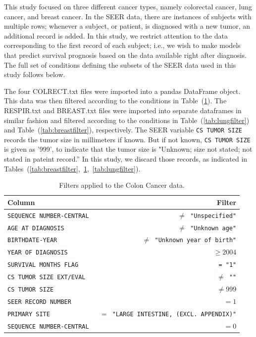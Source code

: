 \documentclass[10pt,letterpaper]{article}
\newcommand{\codewhite}[1]{\colorbox{white}{\texttt{#1}}}
\begin{document}
This study focused on three different cancer types, namely colorectal cancer, lung cancer, and breast cancer. 
In the SEER data, there are instances of subjects with multiple rows; whenever a subject, or patient, is diagnosed with a new tumor, an additional record is added. In this study, we restrict attention to the data corresponding to the first record of each subject; i.e., we wish to make models that predict survival prognosis based on the data available right after diagnosis. The full set of conditions defining the subsets of the SEER data used in this study follows below.



 The four COLRECT.txt files were imported into a pandas DataFrame object.
This data was then filtered according to the conditions in Table~(\ref{tab:colonfilter}).
The RESPIR.txt and BREAST.txt files were imported into separate dataframes in similar fashion and filtered according
to the conditions in Table~(\ref{tab:lungfilter}) and Table~(\ref{tab:breastfilter}), respectively.
The SEER variable \codewhite{CS TUMOR SIZE} records the tumor size in millimeters if known. But if not known, \codewhite{CS TUMOR SIZE} is given as '999', to indicate that the tumor size is "Unknown; size not stated; not stated in pateint record.'' In this study, we discard those records, as indicated in Tables~(\ref{tab:breastfilter},~\ref{tab:colonfilter},~\ref{tab:lungfilter}).






\begin{table}[!ht]
\begin{adjustwidth}{-2.25in}{0in} %
\caption{\label{tab:colonfilter} Filters applied to the Colon Cancer data.}
\begin{tabular}{lr}
\toprule
 Column &  Filter \\
\midrule
\codewhite{SEQUENCE NUMBER-CENTRAL} & \codewhite{$\neq$ "Unspecified"} \\
\codewhite{AGE AT DIAGNOSIS} & \codewhite{$\neq$ "Unknown age"} \\
\codewhite{BIRTHDATE-YEAR} & \codewhite{$\neq$ "Unknown year of birth"} \\
\codewhite{YEAR OF DIAGNOSIS} & \codewhite{$\geq 2004$} \\
\codewhite{SURVIVAL MONTHS FLAG} & \codewhite{= "1"}\\
\codewhite{CS TUMOR SIZE EXT/EVAL} & \codewhite{$\neq$ ""} \\
\codewhite{CS TUMOR SIZE} & \codewhite{$\neq 999$} \\
\codewhite{SEER RECORD NUMBER} & \codewhite{$= 1$} \\
\codewhite{PRIMARY SITE} & \codewhite{ $=$ "LARGE INTESTINE, (EXCL. APPENDIX)"} \\
\codewhite{SEQUENCE NUMBER-CENTRAL} & \codewhite{$=0$} \\
\bottomrule
\end{tabular}
\end{adjustwidth}
\end{table}
\end{document}

